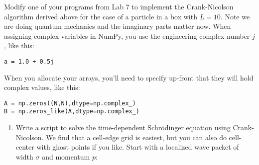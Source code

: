 \begin{problem}\label{P8.2}
Modify one of your programs from Lab 7 to implement the Crank-Nicolson algorithm derived above for the case of a particle in a box with $L = 10$. Note we are doing quantum mechanics and the imaginary parts matter now. When assigning complex variables in NumPy, you use the engineering complex number $j$, like this:
\begin{lstlisting}
a = 1.0 + 0.5j
\end{lstlisting}
When you allocate your arrays, you\rq ll need to specify up-front that they will
hold complex values, like this:
\begin{lstlisting}
A = np.zeros((N,N),dtype=np.complex_)
B = np.zeros_like(A,dtype=np.complex_)
\end{lstlisting}
\begin{enumerate}[label=(\alph*)]
	\item  Write a script to solve the time-dependent Schr{\"o}dinger equation using
Crank-Nicolson. We find that a cell-edge grid is easiest, but you can
also do cell-center with ghost points if you like. Start with a localized
wave packet of width $\sigma$ and momentum $p$:


\end{enumerate}
\end{problem}
